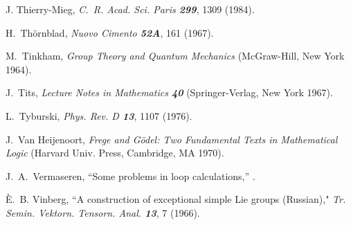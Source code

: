 

 J. Thierry-Mieg,
    {\em C.~R. Acad. Sci. Paris \bf 299}, 1309 (1984).

 H.~Th{\"o}rnblad,
{\em Nuovo Cimento   \bf 52A}, 161 (1967).

 M.~Tinkham,
{\em Group Theory and Quantum Mechanics}
(McGraw-Hill, New York 1964).


J.~Tits,
{\em Lecture Notes in Mathematics  \bf 40}
(Springer-Verlag, New York 1967).

 L.~Tyburski,
    {\em Phys. Rev. D \bf 13}, 1107 (1976).




 J.~Van Heijenoort,
    {\em Frege and G\"odel: Two Fundamental Texts in Mathematical Logic}
    (Harvard Univ. Press, Cambridge, MA 1970).

 J.~A.~Vermaseren,
    ``Some problems in loop calculations,''
. %


 {\`E}.~B. Vinberg,
    ``A construction of exceptional simple Lie groups (Russian),"
    {\em Tr. Semin. Vektorn. Tensorn. Anal. \bf 13}, 7 (1966). %




